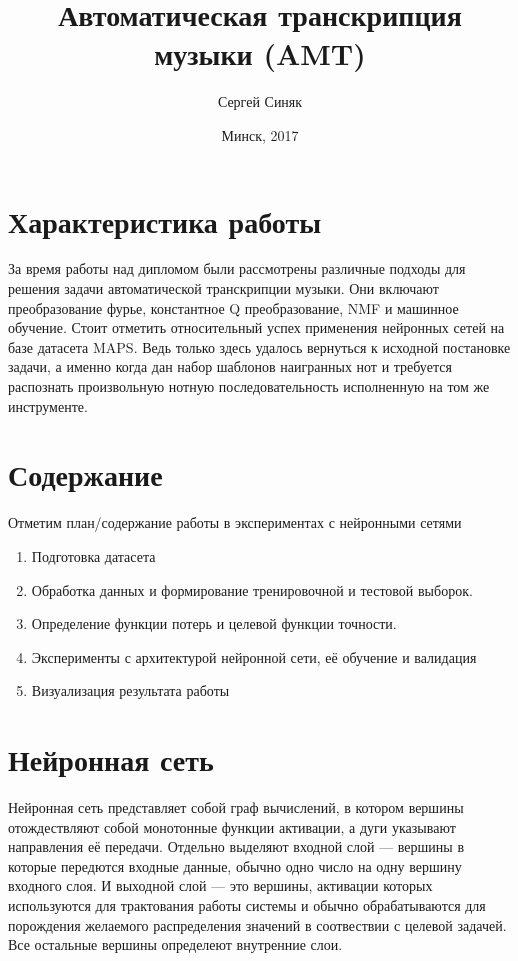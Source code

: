 \documentclass[unicode]{beamer}
\title{Автоматическая транскрипция музыки (AMT)}
\author{Сергей Синяк}
\date{Минск, 2017}
\begin{document}
\begin{frame}
	\titlepage
\end{frame}

\section{Характеристика работы}
\begin{frame}
  За время работы над дипломом были рассмотрены различные подходы
  для решения задачи автоматической транскрипции музыки.
  Они включают преобразование фурье, константное Q преобразование,
  NMF и машинное обучение.
  Стоит отметить относительный успех применения нейронных сетей
  на базе датасета MAPS. Ведь только здесь удалось вернуться
  к исходной постановке задачи, а именно когда
  дан набор шаблонов наигранных нот и требуется распознать
  произвольную нотную последовательность исполненную на том же
  инструменте.
\end{frame}

\section{Содержание}

\begin{frame}
   Отметим план/содержание работы в экспериментах с нейронными сетями
  \begin{enumerate}
    \item Подготовка датасета
    \item Обработка данных и формирование тренировочной и тестовой выборок.
    \item Определение функции потерь и целевой функции точности.
    \item Эксперименты с архитектурой нейронной сети, её обучение и
      валидация
    \item Визуализация результата работы
  \end{enumerate}
\end{frame}

\section{Нейронная сеть}

\begin{frame}
  Нейронная сеть представляет собой граф вычислений, в котором вершины
  отождествляют собой монотонные функции активации, а дуги указывают
  направления её передачи. Отдельно выделяют входной слой --- вершины
  в которые передются входные данные, обычно одно число на одну вершину
  входного слоя. И выходной слой --- это вершины, активации которых используются
  для трактования работы системы и обычно обрабатываются для порождения
  желаемого распределения значений в соотвествии с целевой задачей.
  Все остальные вершины определеют внутренние слои.
\end{frame}
\end{document}
